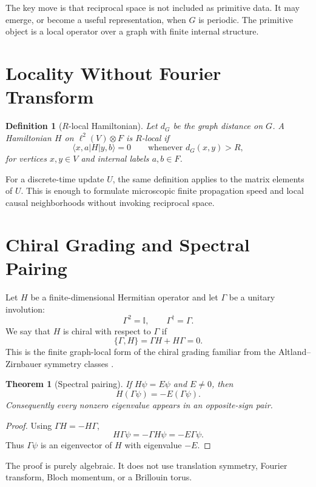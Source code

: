 \documentclass[11pt,a4paper]{article}
\newtheorem{theorem}{Theorem}
\newtheorem{definition}{Definition}
\newcommand{\bbI}{\mathbb{I}}
\newcommand{\Graph}{G}
\newcommand{\Gammaop}{\Gamma}
\begin{document}
The key move is that reciprocal space is not included as primitive data. It may
emerge, or become a useful representation, when $\Graph$ is periodic. The
primitive object is a local operator over a graph with finite internal
structure.

\section{Locality Without Fourier Transform}

\begin{definition}[$R$-local Hamiltonian]
Let $d_G$ be the graph distance on $G$. A Hamiltonian $H$ on
$\ell^2(V)\otimes F$ is $R$-local if
\[
  \langle x,a|H|y,b\rangle = 0
  \qquad \text{whenever } d_G(x,y)>R,
\]
for vertices $x,y\in V$ and internal labels $a,b\in F$.
\end{definition}

For a discrete-time update $U$, the same definition applies to the matrix
elements of $U$. This is enough to formulate microscopic finite propagation
speed and local causal neighborhoods without invoking reciprocal space.

\section{Chiral Grading and Spectral Pairing}

Let $H$ be a finite-dimensional Hermitian operator and let $\Gammaop$ be a
unitary involution:
\[
  \Gammaop^2=\bbI,\qquad \Gammaop^\dagger=\Gammaop.
\]
We say that $H$ is chiral with respect to $\Gammaop$ if
\[
  \{\Gammaop,H\}=\Gammaop H+H\Gammaop=0.
\]
This is the finite graph-local form of the chiral grading familiar from the
Altland--Zirnbauer symmetry classes \cite{AltlandZirnbauer1997}.

\begin{theorem}[Spectral pairing]
If $H\psi=E\psi$ and $E\neq 0$, then
\[
  H(\Gammaop\psi)=-E(\Gammaop\psi).
\]
Consequently every nonzero eigenvalue appears in an opposite-sign pair.
\end{theorem}

\begin{proof}
Using $\Gammaop H=-H\Gammaop$,
\[
  H\Gammaop\psi=-\Gammaop H\psi=-E\Gammaop\psi.
\]
Thus $\Gammaop\psi$ is an eigenvector of $H$ with eigenvalue $-E$.
\end{proof}

The proof is purely algebraic. It does not use translation symmetry, Fourier
transform, Bloch momentum, or a Brillouin torus.
\end{document}

